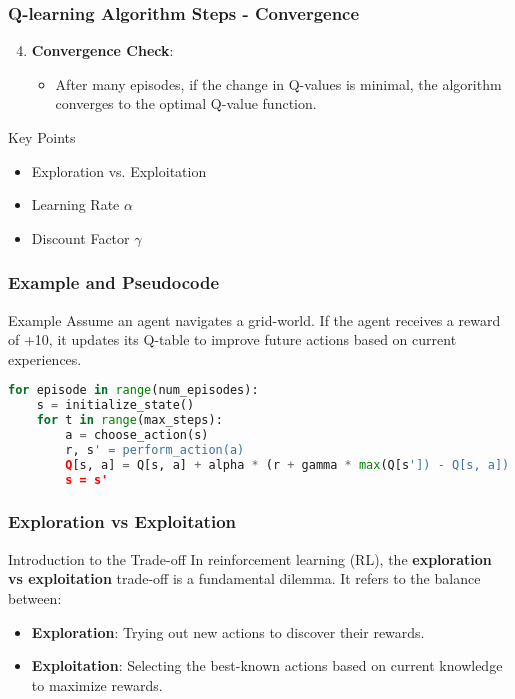 \documentclass{beamer}
\begin{document}
\begin{frame}[fragile]
    \frametitle{Q-learning Algorithm Steps - Convergence}
    \begin{enumerate}
        \setcounter{enumi}{3}  %
        \item \textbf{Convergence Check}: 
        \begin{itemize}
            \item After many episodes, if the change in Q-values is minimal, the algorithm converges to the optimal Q-value function.
        \end{itemize}
    \end{enumerate}
    
    \begin{block}{Key Points}
        \begin{itemize}
            \item Exploration vs. Exploitation 
            \item Learning Rate \( \alpha \) 
            \item Discount Factor \( \gamma \)
        \end{itemize}
    \end{block}
\end{frame}

\begin{frame}[fragile]
    \frametitle{Example and Pseudocode}
    \begin{block}{Example}
        Assume an agent navigates a grid-world. If the agent receives a reward of +10, it updates its Q-table to improve future actions based on current experiences.
    \end{block}
    
    \begin{lstlisting}[language=Python]
for episode in range(num_episodes):
    s = initialize_state()
    for t in range(max_steps):
        a = choose_action(s)
        r, s' = perform_action(a)
        Q[s, a] = Q[s, a] + alpha * (r + gamma * max(Q[s']) - Q[s, a])
        s = s'
    \end{lstlisting}
\end{frame}

\begin{frame}[fragile]
    \frametitle{Exploration vs Exploitation}
    \begin{block}{Introduction to the Trade-off}
        In reinforcement learning (RL), the \textbf{exploration vs exploitation} trade-off is a fundamental dilemma. It refers to the balance between:
        \begin{itemize}
            \item \textbf{Exploration}: Trying out new actions to discover their rewards.
            \item \textbf{Exploitation}: Selecting the best-known actions based on current knowledge to maximize rewards.
        \end{itemize}
    \end{block}
\end{frame}
\end{document}
